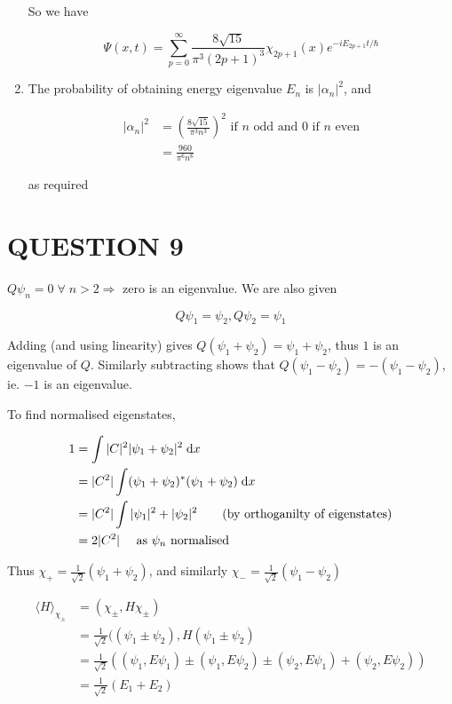\documentclass[a4paper]{article}
\begin{document}
\begin{enumerate}
	So we have
	
	\[ \Psi(x,t) = \sum_{p=0}^{\infty} \frac{8 \sqrt{15}}{\pi^{3}(2p+1)^{3}} \chi_{2p + 1}(x) e^{- i E_{2p + 1} t / \hbar } \]
	
	\item The probability of obtaining energy eigenvalue $ E_{n} $ is $ | \alpha_{n} |^{2} $, and
	
	\begin{align*}
	| \alpha_{n} |^{2} & = \left( \frac{8 \sqrt{15}}{\pi^{3}n^{3}} \right)^{2} \text{ if } n \text{ odd and } 0 \text{ if } n \text{ even} \\
	& = \frac{960}{\pi^{6}n^{6}} 
	\end{align*}
	
	as required
	
\end{enumerate}


\section{QUESTION 9}


$ Q \psi_{n} = 0 \; \forall \;  n > 2 \Rightarrow  $ zero is an eigenvalue. We are also given

\[ Q \psi_{1} = \psi_{2}, Q \psi_{2} = \psi_{1} \]

Adding (and using linearity) gives $ Q(\psi_{1} + \psi_{2})  = \psi_{1} + \psi_{2} $, thus $ 1 $ is an eigenvalue of $ Q $. Similarly subtracting shows that $ Q (\psi_{1} - \psi_{2}) = - (\psi_{1} - \psi_{2}) $, ie. $ -1 $ is an eigenvalue. 

To find normalised eigenstates, 

\begin{align*}
1 & = \int | C |^{2} | \psi_{1} + \psi_{2} |^{2} \; \mathrm{d} x  \\
& = | C^{2} | \int  (\psi_{1} + \psi_{2})^{*} ( \psi_{1} + \psi_{2}) \; \mathrm{d} x\\
& = |  C^{2} | \int | \psi_{1} |^{2} + | \psi_{2} |^{2} \qquad ( \text{by orthoganilty of eigenstates})\\
& = 2 | C^{2} | \quad \text{ as } \psi_{n} \text{ normalised}
\end{align*}

Thus $ \chi_{+} = \frac{1}{\sqrt{2}} (\psi_{1} + \psi_{2})  $, and similarly $ \chi_{-} = \frac{1}{\sqrt{2}} ( \psi_{1} - \psi_{2})  $


\begin{align*}
\langle H \rangle_{\chi_{\pm}} & = ( \chi_{\pm}, H \chi_{\pm} )  \\
& = \frac{1}{\sqrt{2}} (  (\psi_{1} \pm \psi_{2}),  H( \psi_{1} \pm \psi_{2} ) \\
& = \frac{1}{\sqrt{2}} (  (\psi_{1},E \psi_{1}) \pm (\psi_{1},E \psi_{2}) \pm (\psi_{2},E \psi_{1}) + (\psi_{2},E \psi_{2}) ) \\
& = \frac{1}{\sqrt{2}} ( E_{1} + E_{2} )
\end{align*}
\end{document}
